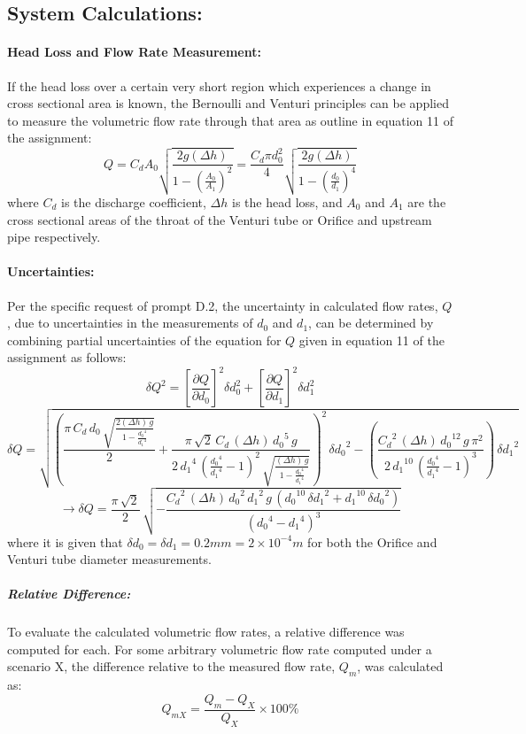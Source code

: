\documentclass[12pt]{article}
\begin{document}
	\subsection{System Calculations:}
	\paragraph{Head Loss and Flow Rate Measurement:}
	If the head loss over a certain very short region which experiences a change in cross sectional area is known, the Bernoulli and Venturi principles can be applied to measure the volumetric flow rate through that area as outline in equation 11 of the assignment:
	\begin{equation}
		Q = C_dA_0\sqrt{\frac{2g(\Delta h)}{1-(\frac{A_0}{A_1})^2}} = \frac{C_d\pi d_0^2}{4}\sqrt{\frac{2g(\Delta h)}{1-(\frac{d_0}{d_1})^4}}
	\end{equation}
	where $C_d$ is the discharge coefficient, $\Delta h$ is the head loss, and $A_0$ and $A_1$ are the cross sectional areas of the throat of the Venturi tube or Orifice and upstream pipe respectively.
	\paragraph{Uncertainties:}
	Per the specific request of prompt D.2, the uncertainty in calculated flow rates, $Q$, due to uncertainties in the measurements of $d_0$ and $d_1$, can be determined by combining partial uncertainties of the equation for $Q$ given in equation 11 of the assignment as follows:
	$$\delta Q^2 = \left[\frac{\partial Q}{\partial d_0}\right]^2\delta d_0^2 + \left[\frac{\partial Q}{\partial d_1}\right]^2\delta d_1^2$$
	$$\delta Q = \sqrt{{\left(\frac{\pi \,C_{d}\,d_{0}\,\sqrt{\frac{2(\Delta h)\,g}{1-\frac{{d_{0}}^4}{{d_{1}}^4}}}}{2}+\frac{\pi \,\sqrt{2}\,C_{d}\,(\Delta h)\,{d_{0}}^5\,g}{2\,{d_{1}}^4\,{\left(\frac{{d_{0}}^4}{{d_{1}}^4}-1\right)}^2\,\sqrt{\frac{(\Delta h)\,g}{1-\frac{{d_{0}}^4}{{d_{1}}^4}}}}\right)}^2\,{\delta d_{0}}^2-\left(\frac{{C_{d}}^2\,(\Delta h)\,{d_{0}}^{12}\,g\,\pi ^2}{2\,{d_{1}}^{10}\,{\left(\frac{{d_{0}}^4}{{d_{1}}^4}-1\right)}^3}\right)\,{\delta d_{1}}^2}$$
	\begin{equation}
		\rightarrow \delta Q = \frac{\pi \,\sqrt{2}}{2}\,\sqrt{-\frac{{C_{d}}^2\,(\Delta h)\,{d_{0}}^2\,{d_{1}}^2\,g\,\left({d_{0}}^{10}\,{\delta d_{1}}^2+{d_{1}}^{10}\,{\delta d_{0}}^2\right)}{{\left({d_{0}}^4-{d_{1}}^4\right)}^3}}
	\end{equation}
	where it is given that $\delta d_0=\delta d_1=0.2mm=2\times10^{-4}m$ for both the Orifice and Venturi tube diameter measurements.
	\subparagraph{Relative Difference:}
	To evaluate the calculated volumetric flow rates, a relative difference was computed for each. For some arbitrary volumetric flow rate computed under a scenario X, the difference relative to the measured flow rate, $Q_m$, was calculated as:
	\begin{equation}
		Q_{mX}=\frac{Q_m - Q_X}{Q_X}\times100\%
	\end{equation}
	
\end{document}

